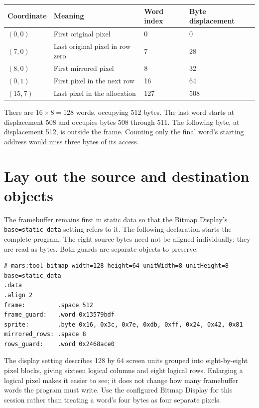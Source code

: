 \begin{center}
  \begin{tabular}{llll}
    \toprule
    Coordinate & Meaning                         & Word index & Byte displacement \\
    \midrule
    $(0,0)$    & First original pixel            & 0          & 0                 \\
    $(7,0)$    & Last original pixel in row zero & 7          & 28                \\
    $(8,0)$    & First mirrored pixel            & 8          & 32                \\
    $(0,1)$    & First pixel in the next row     & 16         & 64                \\
    $(15,7)$   & Last pixel in the allocation    & 127        & 508               \\
    \bottomrule
  \end{tabular}
\end{center}

There are $16\times8=128$ words, occupying 512 bytes. The last word starts at
displacement 508 and occupies bytes 508 through 511. The following byte, at
displacement 512, is outside the frame. Counting only the final word's starting
address would miss three bytes of its access.

\section{Lay out the source and destination objects}

The framebuffer remains first in static data so that the Bitmap Display's
\texttt{base=static\_data} setting refers to it. The following declaration starts
the complete program. The eight source bytes need not be aligned individually;
they are read as bytes. Both guards are separate objects to preserve.

\begin{verbatim}
# mars:tool bitmap width=128 height=64 unitWidth=8 unitHeight=8 base=static_data
.data
.align 2
frame:         .space 512
frame_guard:   .word 0x13579bdf
sprite:        .byte 0x16, 0x3c, 0x7e, 0xdb, 0xff, 0x24, 0x42, 0x81
mirrored_rows: .space 8
rows_guard:    .word 0x2468ace0
\end{verbatim}

The display setting describes 128 by 64 screen units grouped into eight-by-eight
pixel blocks, giving sixteen logical columns and eight logical rows. Enlarging a
logical pixel makes it easier to see; it does not change how many framebuffer
words the program must write. Use the configured Bitmap Display for this session
rather than treating a word's four bytes as four separate pixels.

